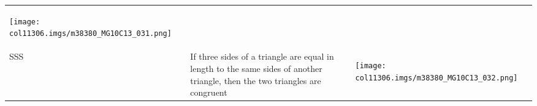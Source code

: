 \begin{table}[H]
\begin{center}
\begin{xtabular*}{\mytablewidth}[t]{|p{10\mystarwidth}|p{10\mystarwidth}|p{10\mystarwidth}|}
    
        
                    
    \setcounter{subfigure}{0}

\label{m38380*id318071}
    \begin{center}
    \label{m38380*id318071!!!underscore!!!media}\label{m38380*id318071!!!underscore!!!printimage}\texttt{[image: col11306.imgs/m38380\_MG10C13\_031.png]} %
        
      \vspace{2pt}
    \vspace{.1in}
    
    \end{center}



    \addtocounter{footnote}{-0}
    
     \tabularnewline{}
    
    
        SSS &
    
    
        If three sides of a triangle are equal in length to the same sides of another triangle, then the two triangles are congruent &
    
    
        
                    
    \setcounter{subfigure}{0}

\label{m38380*id318107}
    \begin{center}
    \label{m38380*id318107!!!underscore!!!media}\label{m38380*id318107!!!underscore!!!printimage}\texttt{[image: col11306.imgs/m38380\_MG10C13\_032.png]} %
        

\end{center}
\end{xtabular*}
\end{center}
\end{table}
